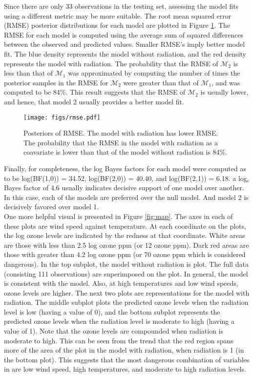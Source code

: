 \documentclass{../../tex_template/asaproc}
\newcommand{\M}{\mathcal{M}}
\begin{document}
Since there are only 33 observations in the testing set, assessing the model
fits using a different metric may be more suitable. The root mean squared error
(RMSE) posterior distributions for each model are plotted in Figure
\ref{fig:rmse}. The RMSE for each model is computed using the average sum of
squared differences between the observed and predicted values. Smaller RMSE's
imply better model fit. The blue density represents the model without
radiation, and the red density represents the model with radiation.  The
probability that the RMSE of $\M_2$ is less than that of $\M_1$ was
approximated by computing the number of times the posterior samples in the RMSE
for $\M_2$ were greater than that of $\M_1$, and was computed to be 84\%.
This result suggests that the RMSE of $\M_2$ is usually lower, and hence, that
model 2 usually provides a better model fit.
\begin{figure}[H]
  \texttt{[image: figs/rmse.pdf]}
  \caption{\small Posteriors of RMSE. The model with radiation has lower RMSE.
    The probability that the RMSE in the model with radiation as a coavariate
    is lower than that of the model without radiation is 84\%.}
  \label{fig:rmse}
\end{figure}

Finally, for completeness, the log Bayes factors for each model were computed
as to be log(BF(1,0)) = 34.52, log(BF(2,0)) =  40.40, and log(BF(2,1)) = 6.18.
a log$_e$ Bayes factor of 4.6 usually indicates decisive support of one model
over another. In this case, each of the models are preferred over the null
model. And model 2 is decisively favored over model 1. \\

One more helpful visual is presented in Figure \ref{fig:map}.  The axes in each
of these plots are wind speed against temperature. At each coordinate on the
plots, the log ozone levels are indicated by the redness at that coordinate.
White areas are those with less than 2.5 log ozone ppm (or 12 ozone ppm).  Dark
red areas are those with greater than 4.2 log ozone ppm (or 70 ozone ppm which
is considered dangerous). In the top subplot, the model without radiation is plot.
The full data (consisting 111 observations) are superimposed on the plot.
In general, the model is consistent with the model. Also, at high temperatures
and low wind speeds, ozone levels are higher. The next two plots are representations
for the model with radiation. The middle subplot plots the predicted ozone levels
when the radiation level is low (having a value of 0), and the
bottom subplot represents the predicted ozone levels when the radiation level is 
moderate to high (having a value of 1). Note that the ozone levels are compounded
when radiation is moderate to high. This can be seen from the trend that
the red region spans more of the area of the plot in the model with radiation,
when radiation is 1 (in the bottom plot). This suggests that the most dangerous
combination of variables in are low wind speed, high temperatures, and moderate
to high radiation levels.
\end{document}

